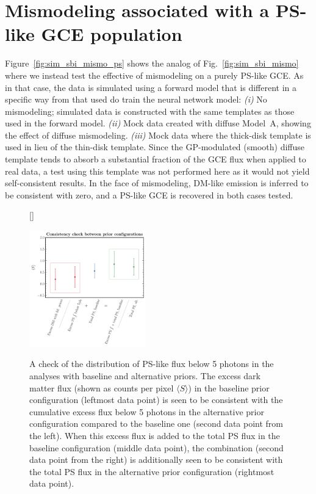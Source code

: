 \documentclass[prd,aps,10pt,nofootinbib,twocolumn,superscriptaddress,preprintnumbers,balancelastpage,longbibliography,floatfix]{revtex4-2}
\begin{document}
\section{Mismodeling associated with a PS-like GCE population}
\label{app:mismodeling_ps}

Figure~\ref{fig:sim_sbi_mismo_ps} shows the analog of Fig.~\ref{fig:sim_sbi_mismo} where we instead test the effective of mismodeling on a purely PS-like GCE. As in that case, the data is simulated using a forward model that is different in a specific way from that used do train the neural network model: \emph{(i)} No mismodeling; simulated data is constructed with the same templates as those used in the forward model. \emph{(ii)} Mock data created with diffuse {Model~A}, showing the effect of diffuse mismodeling. \emph{(iii)} Mock data where the thick-disk template is used in lieu of the thin-disk template. Since the GP-modulated (smooth) diffuse template tends to absorb a substantial fraction of the GCE flux when applied to real data, a test using this template was not performed here as it would not yield self-consistent results. In the face of mismodeling, DM-like emission is inferred to be consistent with zero, and a PS-like GCE is recovered in both cases tested.

%
\begin{figure}
[\FBwidth]
{\vspace{-5mm}\caption{A check of the distribution of PS-like flux below 5 photons in the analyses with baseline and alternative priors. The excess dark matter flux (shown as counts per pixel $\langle S \rangle$) in the baseline prior configuration (leftmost data point) is seen to be consistent with the cumulative excess flux below 5 photons in the alternative prior configuration compared to the baseline one (second data point from the left). When this excess flux is added to the total PS flux in the baseline configuration (middle data point), the combination (second data point from the right) is additionally seen to be consistent with the total PS flux in the alternative prior configuration (rightmost data point).}
\label{fig:consistency}}
{\includegraphics[width=0.45\textwidth]{plots/consistency_check.pdf}}
\end{figure}
%
\end{document}
